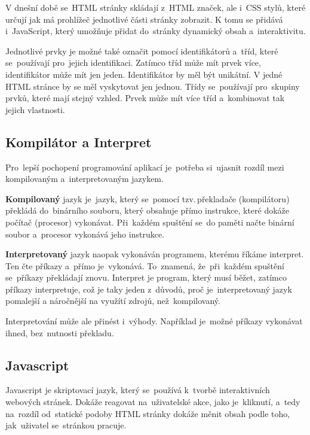\documentclass[14pt,a4paper]{article}
\begin{document}
        V dnešní době se~HTML stránky skládají z~HTML značek, ale i~CSS stylů, které určují jak má prohlížeč jednotlivé části stránky zobrazit.
        K tomu se přidává i~JavaScript, který umožňuje přidat do~stránky dynamický obsah a~interaktivitu. \parencite{berners:1989:proposal}

        Jednotlivé prvky je možné také označit pomocí identifikátorů a~tříd, které se~používají pro~jejich identifikaci.
        Zatímco tříd může mít prvek více, identifikátor může mít jen jeden. Identifikátor by měl být unikátní. V jedné HTML stránce by se měl vyskytovat jen jednou.
        Třídy se~používají pro~skupiny prvků, které mají stejný vzhled. Prvek může mít více tříd a~kombinovat tak jejich vlastnosti. \parencite{jpw:tridy}

        \subsection{Kompilátor a Interpret}
        Pro~lepší pochopení programování aplikací je~potřeba si~ujasnit rozdíl mezi kompilovaným a~interpretovaným jazykem.

        \textbf{Kompilovaný} jazyk je~jazyk, který se~pomocí tzv.\,překladače (kompilátoru) překládá do~binárního souboru, který obsahuje přímo instrukce,
        které dokáže počítač (procesor) vykonávat. Při~každém spuštění se~do paměti načte binární soubor a~procesor vykonává jeho instrukce.

        \textbf{Interpretovaný} jazyk naopak vykonáván programem, kterému říkáme interpret. Ten čte příkazy a~přímo je~vykonává. To~znamená,
        že~při~každém spuštění se~příkazy překládají znovu. Interpret je program, který musí běžet, zatímco příkazy interpretuje,
        což je taky jeden z~důvodů, proč je~interpretovaný jazyk pomalejší a náročnější na využítí zdrojů, než~kompilovaný.
        
        Interpretování může ale přinést i~výhody. Například je~možné příkazy vykonávat ihned, bez~nutnosti překladu. \parencite{ueda:compiled}
        
        \subsection{Javascript}
        Javascript je skriptovací jazyk, který se~používá k~tvorbě interaktivních webových stránek. Dokáže reagovat na~uživatelské akce,
        jako je~kliknutí, a~tedy na~rozdíl od~statické podoby HTML stránky dokáže měnit obsah podle toho, jak~uživatel se~stránkou pracuje.
\end{document}
